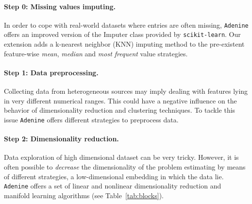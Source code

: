 \documentclass[twoside,11pt]{article}
\makeatletter
\newcommand{\ade}{\texttt{Adenine}\@\xspace}
\makeatother
\begin{document}

\paragraph{Step 0: Missing values imputing.}
  In order to cope with real-world datasets where entries are often missing, \ade offers an improved version of the Imputer class provided by \texttt{scikit-learn}. Our extension adds a k-nearest neighbor (KNN) imputing method to the pre-existent feature-wise \emph{mean}, \emph{median} and \emph{most frequent} value strategies. \citep{troyanskaya2001missing}
  
\paragraph{Step 1: Data preprocessing.}
  Collecting data from heterogeneous sources may imply dealing with features lying in very different numerical ranges. This could have a negative influence on the behavior of dimensionality reduction and clustering techniques. To tackle this issue \ade offers different strategies to preprocess data.

\paragraph{Step 2: Dimensionality reduction.}
  Data exploration of high dimensional dataset can be very tricky. 
  However, it is often possible to \emph{decrease} the dimensionality of the problem estimating by means of different strategies, a low-dimensional embedding in which the data lie. %
  \ade offers a set of linear and nonlinear dimensionality reduction and manifold learning algorithms (see Table~\ref{tab:blocks}).
\end{document}
